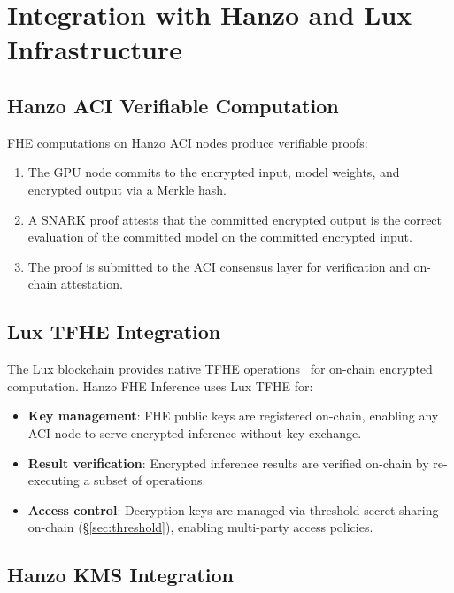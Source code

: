 \documentclass[11pt]{article}
\begin{document}
\section{Integration with Hanzo and Lux Infrastructure}
\label{sec:integration}

\subsection{Hanzo ACI Verifiable Computation}

FHE computations on Hanzo ACI nodes produce verifiable proofs:
\begin{enumerate}[leftmargin=1.4em]
    \item The GPU node commits to the encrypted input, model weights, and
    encrypted output via a Merkle hash.
    \item A SNARK proof attests that the committed encrypted output is the
    correct evaluation of the committed model on the committed encrypted input.
    \item The proof is submitted to the ACI consensus layer for verification
    and on-chain attestation.
\end{enumerate}

\subsection{Lux TFHE Integration}

The Lux blockchain provides native TFHE operations~\cite{luxtfhe} for on-chain
encrypted computation. Hanzo FHE Inference uses Lux TFHE for:
\begin{itemize}[leftmargin=1.1em]
    \item \textbf{Key management}: FHE public keys are registered on-chain,
    enabling any ACI node to serve encrypted inference without key exchange.
    \item \textbf{Result verification}: Encrypted inference results are
    verified on-chain by re-executing a subset of operations.
    \item \textbf{Access control}: Decryption keys are managed via
    threshold secret sharing on-chain (\S\ref{sec:threshold}), enabling
    multi-party access policies.
\end{itemize}

\subsection{Hanzo KMS Integration}
\end{document}
